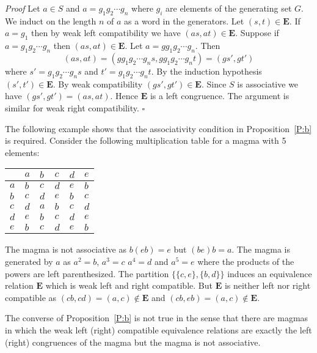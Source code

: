 \documentclass{acmconf}
\begin{document}
\emph{Proof} Let $a\in S$ and $a=g_1g_2\cdots g_n$ where $g_i$ are elements
of the generating set $G$. We induct on the length $n$ of $a$ as a word in the
generators. 
Let $(s,t)\in \mathbf E$. If $a=g_1$ then by weak left compatibility 
we have $(as,at)\in\mathbf E$. Suppose if $a=g_1g_2\cdots g_n$ then
$(as,at)\in\mathbf E$. Let $a=gg_1g_2\cdots g_n$. Then 
$$
(as,at)=(gg_1g_2\cdots g_ns,gg_1g_2\cdots g_nt)=(gs',gt')
$$ 
where $s'=g_1g_2\cdots g_ns$ and $t'=g_1g_2\cdots g_nt$. By the induction
hypothesis $(s',t')\in \mathbf E$. By weak compatibility
$(gs',gt')\in\mathbf E$.
Since $S$ is associative we have $(gs',gt')=(as,at)$. Hence $\mathbf E$ is
a left congruence. The argument is similar for weak right compatibility.
$\square$

The following example shows that the associativity condition in 
Proposition~\ref{P:b} is required.
Consider the following multiplication table for a magma with 5 elements:

\begin{table}[h]
\begin{center}
\begin{tabular}{ l | l   l   l   l   l  }
    & $a$ & $b$ & $c$ & $d$ & $e$ \\ \hline
$a$ & $b$ & $c$ & $d$ & $e$ & $b$ \\ 
$b$ & $c$ & $d$ & $e$ & $b$ & $c$\\ 
$c$ & $d$ & $a$ & $b$ & $c$ & $d$\\
$d$ & $e$ & $b$ & $c$ & $d$ & $e$\\ 
$e$ & $b$ & $c$ & $d$ & $e$ & $b$\\ 
\end{tabular}
\end{center}
\end{table}

The magma is not associative as $b(eb)=e$ 
but $(be)b=a$. The magma is generated by
$a$ as $a^2=b$, $a^3=c$ $a^4=d$ and $a^5=e$ where the
products of the powers are left parenthesized.
The partition $\{\{c,e\},\{b,d\}\}$ induces an equivalence 
relation $\mathbf E$ which is weak left and right compatible.
But $\mathbf E$ is neither left nor right compatible as
$(c b, c d)=(a,c)\not\in \mathbf E$ and
$(c b,e b)=(a,c)\not\in\mathbf E$. 

The converse of Proposition~\ref{P:b} is not true in
the sense that there are  magmas in which
the weak left (right) compatible equivalence 
relations are exactly the left (right) 
congruences of the magma but the magma is not associative.
\end{document}
